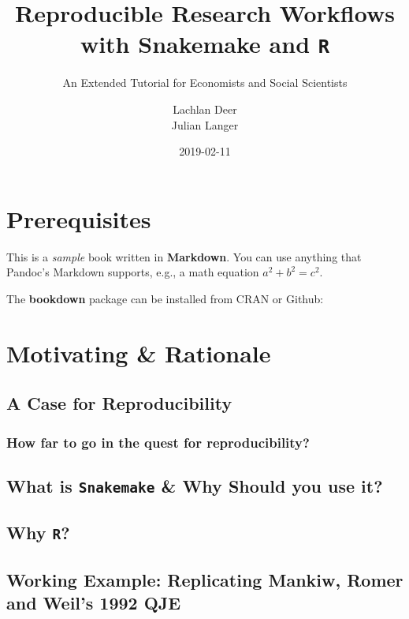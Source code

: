 \documentclass[]{book}
\title{Reproducible Research Workflows with Snakemake and \texttt{R}}
\subtitle{An Extended Tutorial for Economists and Social Scientists}
\author{Lachlan Deer \\ Julian Langer}
\date{2019-02-11}
\theoremstyle{definition}
\theoremstyle{definition}
\theoremstyle{definition}
\theoremstyle{remark}
\begin{document}
\maketitle

{
\setcounter{tocdepth}{1}
\tableofcontents
}
\chapter*{Prerequisites}\label{prerequisites}

This is a \emph{sample} book written in \textbf{Markdown}. You can use
anything that Pandoc's Markdown supports, e.g., a math equation
\(a^2 + b^2 = c^2\).

The \textbf{bookdown} package can be installed from CRAN or Github:

\chapter{Motivating \& Rationale}\label{intro}

\section{A Case for Reproducibility}\label{a-case-for-reproducibility}

\subsection{How far to go in the quest for
reproducibility?}\label{how-far-to-go-in-the-quest-for-reproducibility}

\section{\texorpdfstring{What is \texttt{Snakemake} \& Why Should you
use
it?}{What is Snakemake \& Why Should you use it?}}\label{what-is-snakemake-why-should-you-use-it}

\section{\texorpdfstring{Why \texttt{R}?}{Why R?}}\label{why-r}

\section{Working Example: Replicating Mankiw, Romer and Weil's 1992
QJE}\label{working-example-replicating-mankiw-romer-and-weils-1992-qje}
\end{document}
